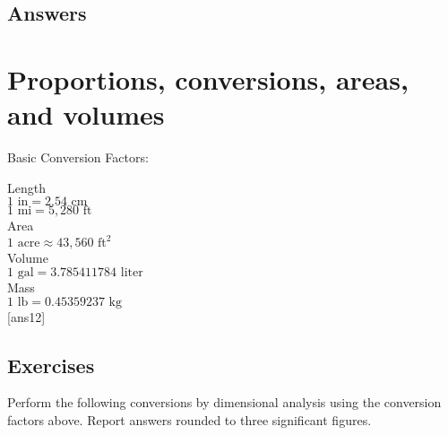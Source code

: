 \documentclass{amsbook}
\numberwithin{section}{chapter}
\numberwithin{equation}{chapter}
\begin{document}
\subsection*{Answers \nopunct} \hfill
\begin{multicols}{2}

\end{multicols}


\newpage
\section{Proportions, conversions, areas, and volumes} \label{conversionsSection}

Basic Conversion Factors:

Length\\
$ 1 \text{ in} = 2.54 \text{ cm}$\\
$ 1 \text{ mi} = 5,280 \text{ ft}$\\

\smallskip
Area\\
$ 1 \text{ acre} \approx 43,560 \text{ ft}^2$\\

\smallskip
Volume\\
$ 1 \text{ gal} = 3.785411784  \text{ liter}$\\

\smallskip
Mass\\
$ 1 \text{ lb} = 0.45359237 \text{ kg}$\\

[ans12]
\subsection*{Exercises \nopunct} \hfill

Perform the following conversions by dimensional analysis using the conversion factors above. Report answers rounded to three significant figures.
\end{document}
